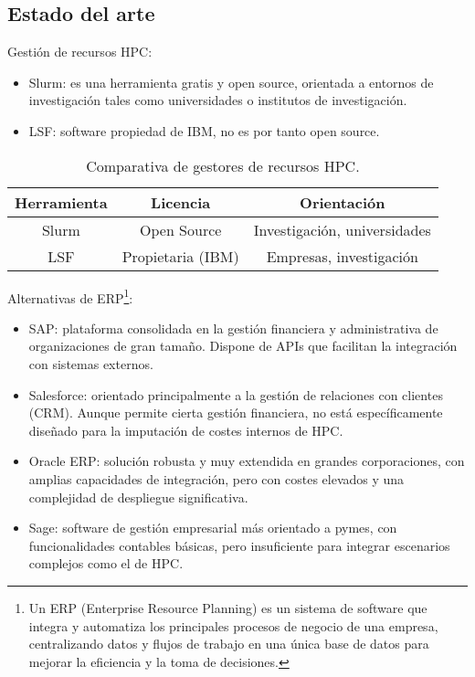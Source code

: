 \subsection{Estado del arte}
Gestión de recursos HPC:
\begin{itemize}
    \item Slurm: es una herramienta gratis y open source, orientada a entornos de investigación tales como universidades o institutos de investigación.
    \item LSF: software propiedad de IBM, no es por tanto open source.
\end{itemize}

\begin{table}[H]
    \centering
    \begin{tabular}{|c|c|c|}
        \hline
        \textbf{Herramienta} & \textbf{Licencia} & \textbf{Orientación} \\
        \hline
        Slurm & Open Source & Investigación, universidades \\
        LSF & Propietaria (IBM) & Empresas, investigación \\
        \hline
    \end{tabular}
    \caption{Comparativa de gestores de recursos HPC.}
    \label{tab:gestores_hpc}
\end{table}

Alternativas de ERP\footnote{Un ERP (Enterprise Resource Planning) es un sistema de software que integra y automatiza 
los principales procesos de negocio de una empresa, centralizando datos y flujos de trabajo en una única base de datos 
para mejorar la eficiencia y la toma de decisiones.}:
\begin{itemize}
    \item SAP: plataforma consolidada en la gestión financiera y administrativa de organizaciones de gran tamaño. Dispone de APIs que facilitan la integración con sistemas externos.
    \item Salesforce: orientado principalmente a la gestión de relaciones con clientes (CRM). Aunque permite cierta gestión financiera, no está específicamente diseñado para la imputación de costes internos de HPC.
    \item Oracle ERP\cite{ComoPuedesDotar}: solución robusta y muy extendida en grandes corporaciones, con amplias capacidades de integración, pero con costes elevados y una complejidad de despliegue significativa.
    \item Sage: software de gestión empresarial más orientado a pymes, con funcionalidades contables básicas, pero insuficiente para integrar escenarios complejos como el de HPC.
\end{itemize}


